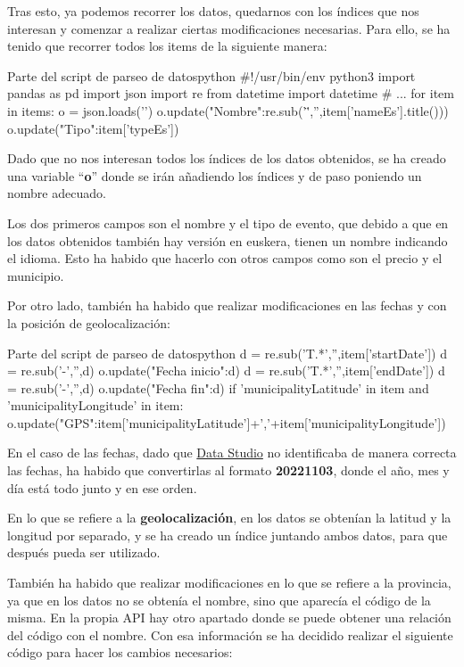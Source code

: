 \documentclass{\ClassPath/viu-tfm-template}
\begin{document}
Tras esto, ya podemos recorrer los datos, quedarnos con los índices que nos interesan y comenzar a realizar ciertas modificaciones necesarias. Para ello, se ha tenido que recorrer todos los items de la siguiente manera:

\begin{mycode}{Parte del script de parseo de datos}{python}{}
#!/usr/bin/env python3
import pandas as pd
import json
import re
from datetime import datetime
# ...
for item in items:
    o = json.loads('{}')
    o.update({"Nombre":re.sub('\"','',item['nameEs'].title())})
    o.update({"Tipo":item['typeEs']})
\end{mycode}

Dado que no nos interesan todos los índices de los datos obtenidos, se ha creado una variable “\textbf{o}” donde se irán añadiendo los índices y de paso poniendo un nombre adecuado.

Los dos primeros campos son el nombre y el tipo de evento, que debido a que en los datos obtenidos también hay versión en euskera, tienen un nombre indicando el idioma. Esto ha habido que hacerlo con otros campos como son el precio y el municipio.

Por otro lado, también ha habido que realizar modificaciones en las fechas y con la posición de geolocalización:


\begin{mycode}{Parte del script de parseo de datos}{python}{{\footnotesize }}
d = re.sub('T.*','',item['startDate'])
d = re.sub('-','',d)
o.update({"Fecha inicio":d})
d = re.sub('T.*','',item['endDate'])
d = re.sub('-','',d)
o.update({"Fecha fin":d})
if 'municipalityLatitude' in item and 'municipalityLongitude' in item:
    o.update({"GPS":item['municipalityLatitude']+','+item['municipalityLongitude']})
\end{mycode}

En el caso de las fechas, dado que \href{https://datastudio.google.com/}{Data Studio} no identificaba de manera correcta las fechas, ha habido que convertirlas al formato \textbf{20221103}, donde el año, mes y día está todo junto y en ese orden.

En lo que se refiere a la \textbf{geolocalización}, en los datos se obtenían la latitud y la longitud por separado, y se ha creado un índice juntando ambos datos, para que después pueda ser utilizado.


También ha habido que realizar modificaciones en lo que se refiere a la provincia, ya que en los datos no se obtenía el nombre, sino que aparecía el código de la misma. En la propia API hay otro apartado donde se puede obtener una relación del código con el nombre. Con esa información se ha decidido realizar el siguiente código para hacer los cambios necesarios:
\end{document}
